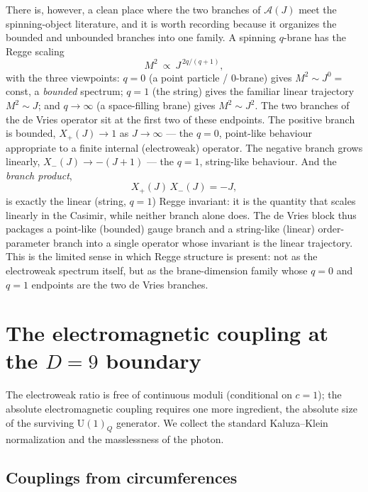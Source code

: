 \documentclass[11pt]{article}
\theoremstyle{plain}
\theoremstyle{definition}
\newcommand{\cA}{\mathcal{A}}
\newcommand{\Xp}{X_{+}}
\newcommand{\Xm}{X_{-}}
\newcommand{\U}{\mathrm{U}}
\begin{document}
There is, however, a clean place where the two branches of $\cA(J)$ meet the
spinning-object literature, and it is worth recording because it organizes the
bounded and unbounded branches into one family. A spinning $q$-brane has the
Regge scaling
\begin{equation}
M^2\ \propto\ J^{\,2q/(q+1)},
\end{equation}
with the three viewpoints: $q=0$ (a point particle / $0$-brane) gives
$M^2\sim J^0=\,$const, a \emph{bounded} spectrum; $q=1$ (the string) gives the
familiar linear trajectory $M^2\sim J$; and $q\to\infty$ (a space-filling
brane) gives $M^2\sim J^2$. The two branches of the de Vries operator sit at
the first two of these endpoints. The positive branch is bounded,
$\Xp(J)\to1$ as $J\to\infty$ --- the $q=0$, point-like behaviour appropriate
to a finite internal (electroweak) operator. The negative branch grows
linearly, $\Xm(J)\to-(J+1)$ --- the $q=1$, string-like behaviour. And the
\emph{branch product},
\begin{equation}
\Xp(J)\,\Xm(J)=-J,
\end{equation}
is exactly the linear (string, $q=1$) Regge invariant: it is the quantity
that scales linearly in the Casimir, while neither branch alone does. The de
Vries block thus packages a point-like (bounded) gauge branch and a
string-like (linear) order-parameter branch into a single operator whose
invariant is the linear trajectory. This is the limited sense in
which Regge structure is present: not as the electroweak spectrum itself, but
as the brane-dimension family whose $q=0$ and $q=1$ endpoints are the two de
Vries branches.

\section{The electromagnetic coupling at the $D=9$ boundary}
\label{sec:alpha}

The electroweak ratio is free of continuous moduli (conditional on $c=1$);
the absolute electromagnetic coupling requires one more ingredient, the
absolute size of the surviving $\U(1)_Q$ generator. We collect the standard
Kaluza--Klein normalization and the masslessness of the photon.

\subsection{Couplings from circumferences}
\end{document}
